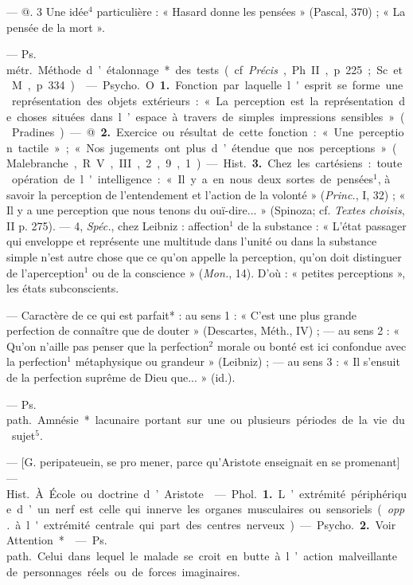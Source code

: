 \begin{itemize}[leftmargin=1cm, label=, itemsep=1pt]
— @. 3 Une idée$^4$ particulière :
« Hasard donne les pensées » (Pascal,
370) ; « La pensée de la mort ».

 — \si{Ps. métr.} Méthode
d’étalonnage* des tests (cf. {\it Précis},
Ph. II, p. 225; Sc. et M., p. 334).

 — \si{Psycho.} O. {\bf 1.} Fonction
par laquelle l'esprit se forme une
représentation des objets extérieurs :
« La perception est la représentation de choses situées dans l’espace à
travers de simples impressions sensibles » (Pradines). — @. {\bf 2.} Exercice
ou résultat de cette fonction : « Une
perception tactile »; « Nos jugements
ont plus d’étendue que nos perceptions » (Malebranche, R. V., III,
2, 9, 1).

— \si{Hist.} {\bf 3.} Chez les cartésiens :
toute opération de l'intelligence :
« Il y a en nous deux sortes de pensées$^1$, à savoir la perception de l’entendement et l’action de la volonté »
({\it Princ.}, I, 32) ; « Il y a une perception que nous tenons du ouï-dire... »
(Spinoza; cf. {\it Textes choisis}, II
p. 275). — 4, {\it Spéc.}, chez Leibniz :
affection$^1$ de la substance : « L'état
passager qui enveloppe et représente une multitude dans l’unité ou
dans la substance simple n’est autre
chose que ce qu’on appelle la perception, qu’on doit distinguer de
l’aperception$^1$ ou de la conscience »
({\it Mon.}, 14). D'où : « petites perceptions », les états subconscients.

 — Caractère de ce qui est
parfait* : au sens 1 : « C’est une plus
grande perfection de connaître que
de douter » (Descartes, Méth., IV) ;
— au sens 2 : « Qu'on n'aille pas
penser que la perfection$^2$ morale ou
bonté est ici confondue avec la perfection$^1$ métaphysique ou grandeur »
(Leibniz) ; — au sens 3 : « Il s'ensuit
de la perfection suprême de Dieu
que... » (id.).

 — \si{Ps. path.}
Amnésie* lacunaire portant sur une
ou plusieurs périodes de la vie du
sujet$^5$.

 — [G. peripateuein, se pro
mener, parce qu’Aristote enseignait
en se promenant] — \si{Hist.} À. École
ou doctrine d’Aristote.

 — \si{Phol.} {\bf 1.} L’extrémité
périphérique d’un nerf est celle qui
innerve les organes musculaires ou
sensoriels ({\it opp.} à l'extrémité centrale
qui part des centres nerveux). —
\si{Psycho.} {\bf 2.} Voir Attention*.

 — \si{Ps. path.}
Celui dans lequel le malade se croit
en butte à l’action malveillante de
personnages réels ou de forces imaginaires.


\end{itemize}
